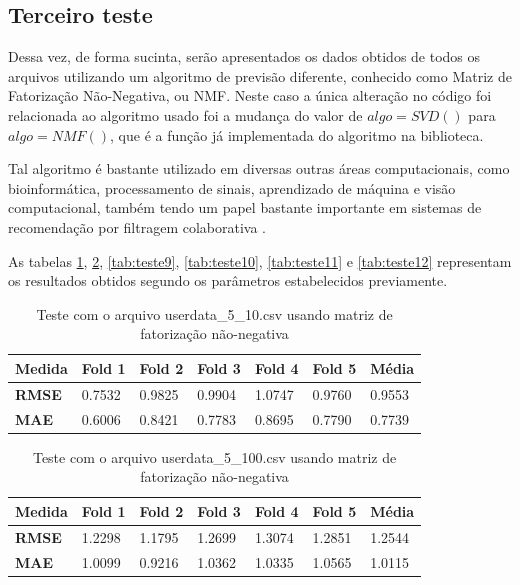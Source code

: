 \documentclass[
	12pt,				%
	oneside,			%
	a4paper,			%
	chapter=TITLE,		%
	english,			%
	french,				%
	spanish,			%
	brazil				%
	]{abntex2}
\begin{document}
\subsection{Terceiro teste}

Dessa vez, de forma sucinta, serão apresentados os dados obtidos de todos os arquivos utilizando um algoritmo de previsão diferente, conhecido como Matriz de Fatorização Não-Negativa, ou NMF. Neste caso a única alteração no código foi relacionada ao algoritmo usado foi a mudança do valor de $algo = SVD()$ para $algo = NMF()$, que é a função já implementada do algoritmo na biblioteca. 

Tal algoritmo é bastante utilizado em diversas outras áreas computacionais, como bioinformática, processamento de sinais, aprendizado de máquina e visão computacional, também tendo um papel bastante importante em sistemas de recomendação por filtragem colaborativa \cite{lee2001algorithms}.

As tabelas \ref{tab:teste7}, \ref{tab:teste8}, \ref{tab:teste9}, \ref{tab:teste10}, \ref{tab:teste11} e \ref{tab:teste12} representam os resultados obtidos segundo os parâmetros estabelecidos previamente.

\begin{table}[ht]
    \centering
    \ABNTEXchapterfont
    \caption{Teste com o arquivo userdata\_5\_10.csv usando matriz de fatorização não-negativa}
    \begin{tabular}{|m{1.5cm}|m{1.5cm}|m{1.5cm}|m{1.5cm}|m{1.5cm}|m{1.5cm}|m{1.5cm}|}
    \hline
        \textbf{Medida}& \textbf{Fold 1} & \textbf{Fold 2} & \textbf{Fold 3} & \textbf{Fold 4}& \textbf{Fold 5} & \textbf{Média}\\
        \hline
        \hline
        \textbf{RMSE} & 0.7532 & 0.9825 & 0.9904 & 1.0747 & 0.9760 & 0.9553   \\ 
        \hline
        \textbf{MAE} & 0.6006 & 0.8421 & 0.7783 & 0.8695 & 0.7790 & 0.7739 \\
        \hline
    \end{tabular}
    \label{tab:teste7}
\end{table}

\begin{table}[ht]
    \centering
    \ABNTEXchapterfont
    \caption{Teste com o arquivo userdata\_5\_100.csv usando matriz de fatorização não-negativa}
    \begin{tabular}{|m{1.5cm}|m{1.5cm}|m{1.5cm}|m{1.5cm}|m{1.5cm}|m{1.5cm}|m{1.5cm}|}
    \hline
        \textbf{Medida}& \textbf{Fold 1} & \textbf{Fold 2} & \textbf{Fold 3} & \textbf{Fold 4}& \textbf{Fold 5} & \textbf{Média}\\
        \hline
        \hline
        \textbf{RMSE} & 1.2298 & 1.1795 & 1.2699 & 1.3074 & 1.2851 & 1.2544\\ 
        \hline
        \textbf{MAE} & 1.0099 & 0.9216 & 1.0362 & 1.0335 & 1.0565 & 1.0115\\
        \hline
    \end{tabular}
    \label{tab:teste8}
\end{table}
\end{document}
